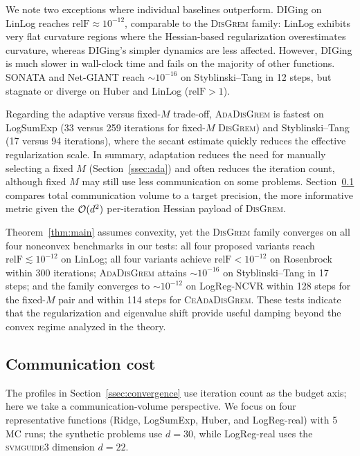 \documentclass[review,onefignum,onetabnum]{siamart171218}
\begin{document}
	We note two exceptions where individual baselines outperform.
	DIGing on LinLog reaches $\mathrm{relF}\approx10^{-12}$, comparable
	to the \textsc{DisGrem} family:
	LinLog exhibits very flat curvature regions where
	the Hessian-based regularization overestimates curvature,
	whereas DIGing's simpler dynamics are less affected.
	However, DIGing is much slower in wall-clock time
	and fails on the majority of other functions.
	SONATA and Net-GIANT reach $\sim10^{-16}$ on
	Styblinski--Tang in 12 steps, but stagnate or diverge on
	Huber and LinLog ($\mathrm{relF}>1$).
	
	Regarding the adaptive versus fixed-$M$ trade-off,
	\textsc{AdaDisGrem} is fastest on LogSumExp
	(33 versus 259 iterations for fixed-$M$ \textsc{DisGrem}) and
	Styblinski--Tang (17 versus 94 iterations), where the secant estimate
	quickly reduces the effective regularization scale.
	In summary, adaptation reduces the need for manually selecting a fixed $M$
	(Section~\ref{ssec:ada}) and often reduces the iteration count,
	although fixed $M$ may still use less communication on some problems.
	Section~\ref{ssec:commexp} compares total communication
	volume to a target precision, the more informative metric
	given the $\mathcal{O}(d^2)$ per-iteration Hessian payload of \textsc{DisGrem}.
	
	Theorem~\ref{thm:main} assumes convexity, yet the \textsc{DisGrem}
	family converges on all four nonconvex benchmarks in our tests:
	all four proposed variants reach $\mathrm{relF}\lesssim10^{-12}$ on
	LinLog; all four variants achieve
	$\mathrm{relF}<10^{-12}$ on Rosenbrock within 300 iterations;
	\textsc{AdaDisGrem} attains $\sim10^{-16}$ on Styblinski--Tang in
	17 steps; and the family converges to $\sim10^{-12}$ on
	LogReg-NCVR within 128 steps for the fixed-$M$ pair and within
	114 steps for \textsc{CeAdaDisGrem}.
	These tests indicate that the regularization and eigenvalue shift provide
	useful damping beyond the convex regime analyzed in the theory.
	
	\FloatBarrier
	\subsection{Communication cost}\label{ssec:commexp}
	
	The profiles in Section~\ref{ssec:convergence} use iteration count
	as the budget axis; here we take a communication-volume perspective.
	We focus on four representative functions (Ridge, LogSumExp, Huber,
	and LogReg-real) with 5 MC runs; the synthetic problems use $d=30$,
	while LogReg-real uses the \textsc{svmguide3} dimension $d=22$.
	
\end{document}
